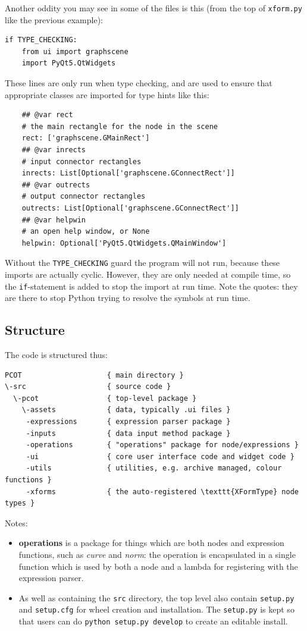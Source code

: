 Another oddity you may see in some of the files is this (from the top
of \texttt{xform.py} like the previous example):
\begin{lstlisting}
if TYPE_CHECKING:
    from ui import graphscene
    import PyQt5.QtWidgets
\end{lstlisting}
These lines are only run when type checking, and are used to ensure
that appropriate classes are imported for type hints like this:
\begin{lstlisting}
    ## @var rect
    # the main rectangle for the node in the scene
    rect: ['graphscene.GMainRect']
    ## @var inrects
    # input connector rectangles
    inrects: List[Optional['graphscene.GConnectRect']]
    ## @var outrects
    # output connector rectangles
    outrects: List[Optional['graphscene.GConnectRect']]
    ## @var helpwin
    # an open help window, or None
    helpwin: Optional['PyQt5.QtWidgets.QMainWindow']
\end{lstlisting}
Without the \texttt{TYPE\_CHECKING} guard the program will not run, because
these imports are actually cyclic. However, they are only needed at 
compile time, so the \texttt{if}-statement is added to stop the import
at run time. Note the quotes: they are there to stop Python trying to
resolve the symbols at run time.

\subsection{Structure}
The code is structured thus:
\begin{verbatim}
PCOT                    { main directory }
\-src                   { source code }
  \-pcot                { top-level package }
    \-assets            { data, typically .ui files }
     -expressions       { expression parser package }
     -inputs            { data input method package }
     -operations        { "operations" package for node/expressions }
     -ui                { core user interface code and widget code }
     -utils             { utilities, e.g. archive managed, colour functions }
     -xforms            { the auto-registered \texttt{XFormType} node types }
\end{verbatim}
Notes:
\begin{itemize}
\item \textbf{operations} is a package for things which are both nodes and
expression functions, such as \emph{curve} and \emph{norm}: the operation
is encapsulated in a single function which is used by both a node
and a lambda for registering with the expression parser.
\item As well as containing the \texttt{src} directory, the top level
also contain \texttt{setup.py} and \texttt{setup.cfg} for wheel creation
and installation. The \texttt{setup.py} is kept so that users can do
\texttt{python setup.py develop} to create an editable install.
\end{itemize}

